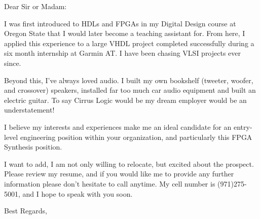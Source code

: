 \documentclass[]{friggeri-letter}
\begin{document}
       {}

\begin{letter}{}

\opening{Dear Sir or Madam:}

I was first introduced to HDLs and FPGAs in my Digital Design course at Oregon State that I would 
later become a teaching assistant for. From here, I applied this experience to a large VHDL project 
completed successfully during a six month internship at Garmin AT. I have been
chasing VLSI projects ever since.

Beyond this, I've always loved audio. I built my own bookshelf (tweeter, woofer, and crossover) 
speakers, installed far too much car audio equipment and built an electric guitar. To say 
Cirrus Logic would be my dream employer would be an understatement!

I believe my interests and experiences make me an ideal candidate for an entry-level 
engineering position within your organization, and particularly this FPGA Synthesis position.

I want to add, I am not only willing to relocate, but excited about the prospect. Please review my 
resume, and if you would like me to provide any further information please don't
hesitate to call anytime. My cell number is (971)275-5001, and I hope to speak with you soon.

\closing{Best Regards,}

\end{letter}
\end{document}
